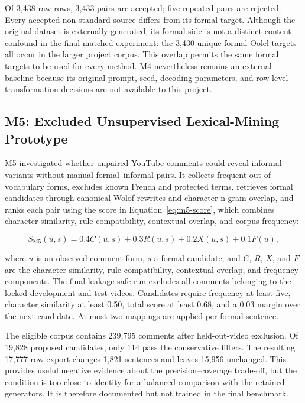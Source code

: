 \documentclass[12pt, a4paper, twoside, openany]{report}
\begin{document}
Of 3,438 raw rows, 3,433 pairs are accepted; five repeated pairs are rejected. Every accepted non-standard source differs from its formal target. Although the original dataset is externally generated, its formal side is not a distinct-content confound in the final matched experiment: the 3,430 unique formal Oolel targets all occur in the larger project corpus. This overlap permits the same formal targets to be used for every method. M4 nevertheless remains an external baseline because its original prompt, seed, decoding parameters, and row-level transformation decisions are not available to this project.


\subsection{M5: Excluded Unsupervised Lexical-Mining Prototype}

M5 investigated whether unpaired YouTube comments could reveal informal variants without manual formal--informal pairs. It collects frequent out-of-vocabulary forms, excludes known French and protected terms, retrieves formal candidates through canonical Wolof rewrites and character n-gram overlap, and ranks each pair using the score in Equation~\eqref{eq:m5-score}, which combines character similarity, rule compatibility, contextual overlap, and corpus frequency:

\begin{equation}
	S_{\mathrm{M5}}(u,s)=0.4C(u,s)+0.3R(u,s)+0.2X(u,s)+0.1F(u),
	\label{eq:m5-score}
\end{equation}

where $u$ is an observed comment form, $s$ a formal candidate, and $C$, $R$, $X$, and $F$ are the character-similarity, rule-compatibility, contextual-overlap, and frequency components. The final leakage-safe run excludes all comments belonging to the locked development and test videos. Candidates require frequency at least five, character similarity at least 0.50, total score at least 0.68, and a 0.03 margin over the next candidate. At most two mappings are applied per formal sentence.

The eligible corpus contains 239,795 comments after held-out-video exclusion. Of 19,828 proposed candidates, only 114 pass the conservative filters. The resulting 17,777-row export changes 1,821 sentences and leaves 15,956 unchanged. This provides useful negative evidence about the precision--coverage trade-off, but the condition is too close to identity for a balanced comparison with the retained generators. It is therefore documented but not trained in the final benchmark.
\end{document}
